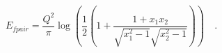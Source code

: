 \begin{equation}
E_{fpair} = \frac{Q^2}{\pi} \log\left(\frac{1}{2}\left(1+\frac{1+x_1x_2}{\sqrt{x_1^2-1}\sqrt{x_2^2-1}}\right)\right)\quad.
\label{Eneedle}
\end{equation}

